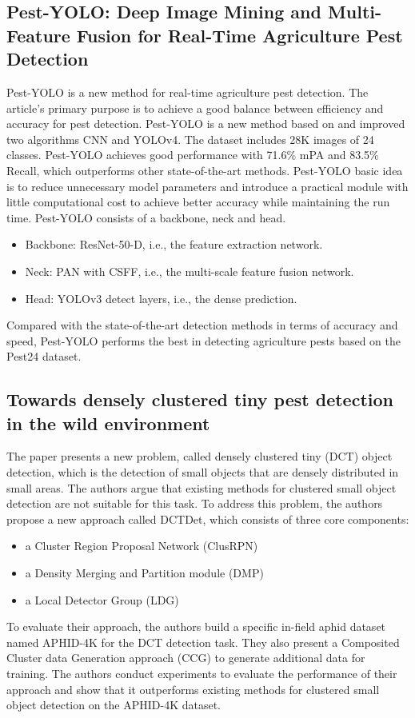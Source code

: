 \documentclass{article}
\begin{document}
\subsection*{Pest-YOLO: Deep Image Mining and Multi-Feature Fusion for Real-Time Agriculture Pest Detection \cite{PestYOLO}}
Pest-YOLO is a new method for real-time agriculture pest detection. The article's primary purpose is to achieve a
good balance between efficiency and accuracy for pest detection.
Pest-YOLO is a new method based on and improved two algorithms CNN and YOLOv4.
The dataset includes 28K images of 24 classes. Pest-YOLO achieves good performance with 71.6\% mPA and
83.5\% Recall, which outperforms other state-of-the-art methods. Pest-YOLO basic idea is to reduce
unnecessary model parameters and introduce a practical module with little computational cost to
achieve better accuracy while maintaining the run time. Pest-YOLO consists of a backbone, neck and head.
\begin{itemize}
    \item Backbone: ResNet-50-D, i.e., the feature extraction network.
    \item Neck: PAN with CSFF, i.e., the multi-scale feature fusion network.
    \item Head: YOLOv3 detect layers, i.e., the dense prediction.
\end{itemize}
Compared with the state-of-the-art detection methods in terms of accuracy and speed, 
Pest-YOLO performs the best in detecting agriculture pests based on the Pest24 dataset.


\subsection*{Towards densely clustered tiny pest detection in the wild environment \cite{DenseTinyPest}}

The paper presents a new problem, called densely clustered tiny (DCT) object detection, which is the detection of 
small objects that are densely distributed in small areas.
The authors argue that existing methods for clustered small object detection are not suitable for this task. 
To address this problem, the authors propose a new approach called DCTDet, which consists of three core components:
\begin{itemize}
    \item a Cluster Region Proposal Network (ClusRPN)
    \item  a Density Merging and Partition module (DMP)
    \item a Local Detector Group (LDG)
\end{itemize}
To evaluate their approach, the authors build a specific in-field aphid dataset named APHID-4K 
for the DCT detection task. They also present a Composited Cluster data Generation approach (CCG) 
to generate additional data for training.
The authors conduct experiments to evaluate the performance of their approach and 
show that it outperforms existing methods for clustered small object detection on the APHID-4K dataset.
\end{document}
